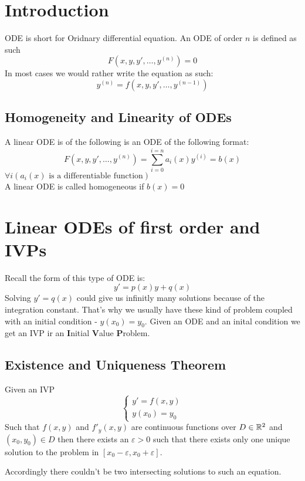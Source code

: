 \documentclass[11pt,a4paper]{article}
\begin{document}
	\maketitle
	\newpage
	\tableofcontents
	\newpage
	\section{Introduction}
	ODE is short for Oridnary differential equation.
  An ODE of order $n$ is defined as such
	\[
		F(x,y,y',\ldots,y^{(n)})=0
	\]
	In most cases we would rather write the equation as such:
	\[
		y^{(n)}=f(x,y,y',\ldots,y^{(n-1)})
	\]
	\subsection{Homogeneity and Linearity of ODEs}
	A linear ODE is of the following is an ODE of the following format:
	\[
		F(x,y,y',\ldots,y^{(n)})=\sum_{i=0}^{i=n}{a_i(x)y^{(i)}}=b(x)
	\]
	$\forall i(a_i(x)\text{ is a differentiable function})$
	\\ A linear ODE is called homogeneous if $b(x)=0$	
	
	\newpage
	\section{Linear ODEs of first order and IVPs}
	Recall the form of this type of ODE is:
	\[
		y'=p(x)y+q(x)
	\]
	Solving $y'=q(x)$ could give us infinitly many solutions because of the 
  integration constant.
  That's why we usually have these kind of problem coupled with an
  initial condition - $y(x_0)=y_0$.
  Given an ODE and an inital condition we get an IVP ir an 
  \textbf{I}nitial \textbf{V}alue \textbf{P}roblem.
	\subsection{Existence and Uniqueness Theorem}
	Given an IVP
	\begin{equation}
    \begin{cases}
    y'=f(x,y) \\
    y(x_0)=y_0
    \end{cases}
	\end{equation}
	Such that $f(x,y)$ and $f'_y(x,y)$ are continuous functions over $D\in\mathbb{R}^2$ 
  and $(x_0,y_0)\in D$ then there exists an $\varepsilon>0$ such that there 
  exists only one unique solution to the problem in 
  $[x_0-\varepsilon,x_0+\varepsilon]$.

	Accordingly there couldn't be two intersecting solutions to such an equation.
\end{document}
